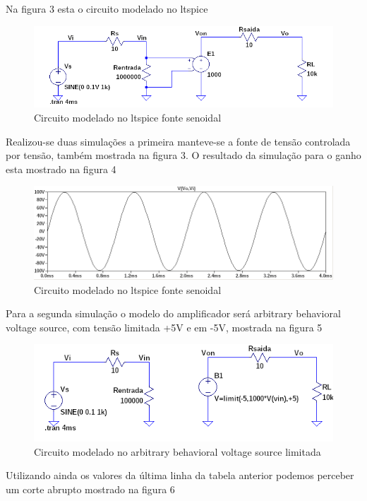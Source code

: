 \documentclass[a4paper, 12pt]{article}
\begin{document}
Na figura 3 esta o circuito modelado no ltspice
\begin{figure}[H]
\centering
\includegraphics[scale=0.5]{ltspicetras.png}
\caption{Circuito modelado no ltspice fonte senoidal}
\label{Rotulo}
\end{figure}
Realizou-se duas simulações a primeira manteve-se a fonte de tensão controlada por tensão, também mostrada na figura 3. O resultado da simulação para o ganho esta mostrado na figura 4
\begin{figure}[H]
\centering
\includegraphics[scale=0.5]{grafico.png}
\caption{Circuito modelado no ltspice fonte senoidal}
\label{Rotulo}
\end{figure}

Para a segunda simulação o modelo do amplificador será  arbitrary behavioral voltage source, com tensão limitada  +5V e em -5V, mostrada na figura 5

\begin{figure}[H]
\centering
\includegraphics[scale=0.5]{ltspicelimit.png}
\caption{Circuito modelado no arbitrary behavioral voltage source limitada}
\label{Rotulo}
\end{figure}

Utilizando ainda os valores da última linha da tabela anterior podemos perceber um corte abrupto mostrado na figura 6
\end{document}
